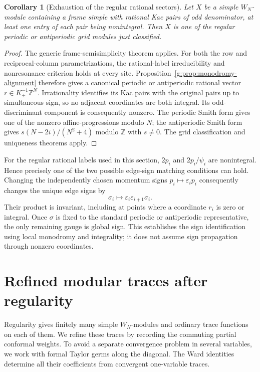 \documentclass[11pt,a4paper]{article}
\numberwithin{equation}{section}
\newtheorem{corollary}[theorem]{Corollary}
\theoremstyle{definition}\newtheorem{definition}[theorem]{Definition}
\theoremstyle{remark}\newtheorem{remark}[theorem]{Remark}
\begin{document}
\begin{corollary}[Exhaustion of the regular rational sectors]
\label{g:cor:regular-rational-exhaustion}
Let $X$ be a simple $W_N$-module containing a frame simple with
rational Kac pairs of odd denominator, at least one entry of each
pair being nonintegral. Then $X$ is one of the regular periodic
or antiperiodic grid modules just classified.
\end{corollary}
\begin{proof}
The generic frame-semisimplicity theorem applies. For both the row
and reciprocal-column parametrizations, the rational-label
irreducibility and nonresonance criterion holds at every site.
Proposition~\ref{g:prop:monodromy-alignment} therefore gives a
canonical periodic or antiperiodic rational vector
$r\in K_\pm^{-1}\mathbb Z^N$. Irrationality identifies its Kac
pairs with the original pairs up to simultaneous sign, so no
adjacent coordinates are both integral. Its odd-discriminant
component is consequently nonzero. The periodic Smith form gives
one of the nonzero affine-progressions modulo $N$; the antiperiodic
Smith form gives $s(N-2i)/(N^2+4)$ modulo $\mathbb Z$ with
$s\ne0$. The grid classification and uniqueness theorems apply.
\end{proof}

For the regular rational labels used in this section,
$2p_i$ and $2p_i/\psi_i$ are nonintegral. Hence precisely one
of the two possible edge-sign matching conditions can hold.
Changing the independently chosen momentum signs
$p_i\mapsto\varepsilon_ip_i$ consequently changes the unique
edge signs by
\[
                  \sigma_i\mapsto
                    \varepsilon_i\varepsilon_{i+1}\sigma_i.
\]
Their product is invariant, including at points where a coordinate
$r_i$ is zero or integral. Once $\sigma$ is fixed to the standard
periodic or antiperiodic representative, the only remaining gauge
is global sign. This establishes the sign identification using
local monodromy and integrality; it does not assume sign propagation
through nonzero coordinates.


\section{Refined modular traces after regularity}
\label{sec:ordinary-jets}

Regularity gives finitely many simple $W_N$-modules and ordinary
trace functions on each of them.  We refine these traces by recording
the commuting partial conformal weights.  To avoid a separate
convergence problem in several variables, we work with formal
Taylor germs along the diagonal.  The Ward identities determine
all their coefficients from convergent one-variable traces.
\end{document}
